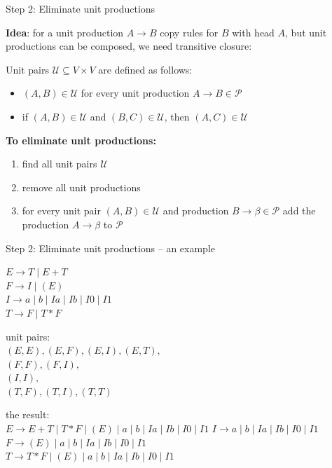\documentclass[handout]{beamer}
\begin{document}
\begin{frame}{Step 2: Eliminate unit productions}

	\textbf{Idea}: for a unit production $A\to B$ copy rules for $B$ with head $A$, but unit productions can be composed, we need transitive closure:

	\alert{Unit pairs} $\mathcal U\subseteq V\times V$ are defined as follows:
	\begin{itemize}
		\item $(A,B)\in\mathcal U$ for every unit production $A\to B\in\mathcal P$
		\item if $(A,B)\in\mathcal U$ and $(B,C)\in\mathcal U$, then $(A,C)\in\mathcal U$
	\end{itemize}

	\textbf{To eliminate unit productions:} 
	\begin{enumerate}
		\item find all unit pairs $\mathcal U$
		\item remove all unit productions
		\item for every unit pair $(A,B)\in\mathcal U$ and production $B\to\mathcal\beta\in\mathcal P$ add the production $A\to\beta$ to $\mathcal P$
	\end{enumerate}

\end{frame}
	

\begin{frame}{Step 2: Eliminate unit productions -- an example}

	$E\to T\mid E+T$\\
	$F\to I\mid (E)$\\
	$I\to a\mid b\mid Ia\mid Ib\mid I0\mid I1$\\
	$T\to F\mid T*F$

	unit pairs:\\		
	$(E,E),(E,F),(E,I),(E,T),$\\
	$(F,F),(F,I),$\\
	$(I,I),$\\
	$(T,F),(T,I),(T,T)$

	the result:\\
	$E\to E+T\mid T*F\mid (E)\mid a\mid b\mid Ia\mid Ib\mid I0\mid I1$
	$I\to a\mid b\mid Ia\mid Ib\mid I0\mid I1$\\
	$F\to (E)\mid a\mid b\mid Ia\mid Ib\mid I0\mid I1$\\
	$T\to T*F\mid (E)\mid a\mid b\mid Ia\mid Ib\mid I0\mid I1$\\
	

\end{frame}
\end{document}
